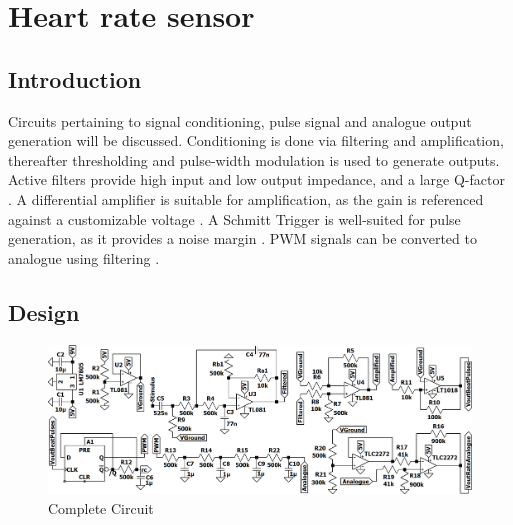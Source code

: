 \chapter{Heart rate sensor}\label{ch:heartRate}

\section{Introduction} \label{sec:heartIntro}
Circuits pertaining to signal conditioning, pulse signal and analogue output generation will be discussed. Conditioning is done via filtering and amplification, thereafter thresholding and pulse-width modulation is used to generate outputs. Active filters provide high input and low output impedance, and a large Q-factor \cite{actpas}. A differential amplifier is suitable for amplification, as the gain is referenced against a customizable voltage \cite{opamp}. A Schmitt Trigger is well-suited for pulse generation, as it provides a noise margin \cite{schmitt}. PWM signals can be converted to analogue using filtering \cite{PWM}.

\section{Design} \label{sec:heartDesign}
\begin{figure}[h]
    \centering
    \vspace{-0.6cm}
    \includegraphics[width = 1\textwidth]{Figures/circuit2}
    \caption{Complete Circuit}
    \label{fig:circuit}
\end{figure}

